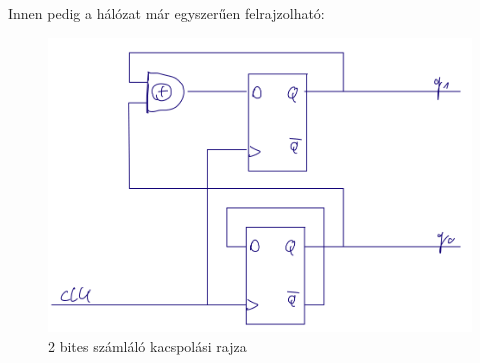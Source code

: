 Innen pedig a hálózat már egyszerűen felrajzolható:
\begin{figure}[h!]

    \centering
    \includegraphics[width=0.75\linewidth]{Figures//tmp/31_schematic.png}
    \caption{2 bites számláló kacspolási rajza}
    \label{fig:enter-label}
\end{figure}
